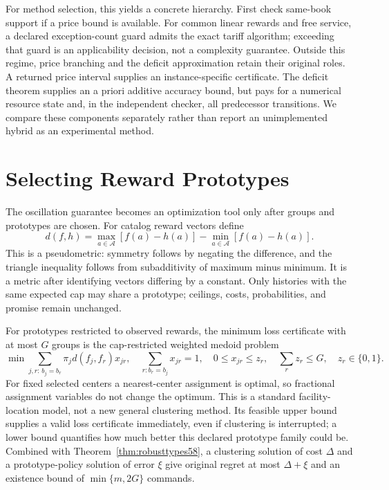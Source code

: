 \documentclass[11pt,letterpaper]{article}
\theoremstyle{definition}\newtheorem{remark}[theorem]{Remark}
\begin{document}
For method selection, this yields a concrete hierarchy. First check same-book support if a price bound is available. For common linear rewards and free service, a declared exception-count guard admits the exact tariff algorithm; exceeding that guard is an applicability decision, not a complexity guarantee. Outside this regime, price branching and the deficit approximation retain their original roles. A returned price interval supplies an instance-specific certificate. The deficit theorem supplies an a priori additive accuracy bound, but pays for a numerical resource state and, in the independent checker, all predecessor transitions. We compare these components separately rather than report an unimplemented hybrid as an experimental method.
\section{Selecting Reward Prototypes}\label{sec:grouping59}
The oscillation guarantee becomes an optimization tool only after groups and prototypes are chosen. For catalog reward vectors define
\[
 d(f,h)=\max_{a\in\mathcal A}[f(a)-h(a)]-\min_{a\in\mathcal A}[f(a)-h(a)].
\]
This is a pseudometric: symmetry follows by negating the difference, and the triangle inequality follows from subadditivity of maximum minus minimum. It is a metric after identifying vectors differing by a constant. Only histories with the same expected cap may share a prototype; ceilings, costs, probabilities, and promise remain unchanged.

For prototypes restricted to observed rewards, the minimum loss certificate with at most $G$ groups is the cap-restricted weighted medoid problem
\[
 \min\sum_{j,r:\,b_j=b_r}\pi_jd(f_j,f_r)x_{jr},\quad
 \sum_{r:b_r=b_j}x_{jr}=1,\quad 0\leq x_{jr}\leq z_r,\quad
 \sum_r z_r\leq G,\quad z_r\in\{0,1\}.
\]
For fixed selected centers a nearest-center assignment is optimal, so fractional assignment variables do not change the optimum. This is a standard facility-location model, not a new general clustering method. Its feasible upper bound supplies a valid loss certificate immediately, even if clustering is interrupted; a lower bound quantifies how much better this declared prototype family could be. Combined with Theorem~\ref{thm:robusttypes58}, a clustering solution of cost $\Delta$ and a prototype-policy solution of error $\xi$ give original regret at most $\Delta+\xi$ and an existence bound of $\min\{m,2G\}$ commands.
\end{document}
